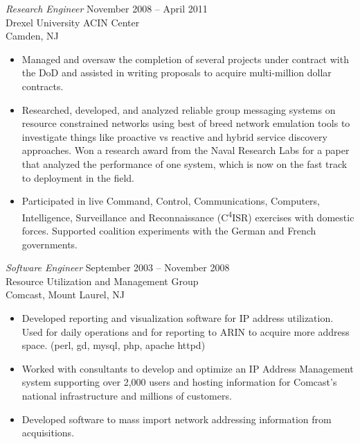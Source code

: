 \documentclass[margin]{res}
\begin{document}
\begin{resume}
  {\sl Research Engineer} \hfill  November 2008 -- April 2011 \\
    Drexel University ACIN Center \\
    Camden, NJ
    \begin{itemize}  \itemsep -2pt %
      \item Managed and oversaw the completion of several projects under contract with the DoD and assisted in writing proposals to acquire multi-million dollar contracts.
      \item Researched, developed, and analyzed reliable group messaging systems on resource constrained networks using best of breed network emulation tools to investigate things like proactive vs reactive and hybrid service discovery approaches.
            Won a research award from the Naval Research Labs for a paper that analyzed the performance of one system, which is now on the fast track to deployment in the field.
      \item Participated in live Command, Control, Communications, Computers, Intelligence, Surveillance and Reconnaissance (C\textsuperscript{4}ISR) exercises  with domestic forces. Supported coalition experiments with the German and French governments.
    \end{itemize}

  {\sl Software Engineer} \hfill  September 2003 -- November 2008 \\
    Resource Utilization and Management Group \\
    Comcast, Mount Laurel, NJ
    \begin{itemize}  \itemsep -2pt %
      \item Developed reporting and visualization software for IP address utilization. Used for daily operations and for reporting to ARIN to acquire more address space. (perl, gd, mysql, php, apache httpd)
      \item Worked with consultants to develop and optimize an IP Address Management system supporting over 2,000 users and hosting information for Comcast's national infrastructure and millions of customers.
      \item Developed software to mass import network addressing information from acquisitions.
     \end{itemize}


\end{resume}
\end{document}
